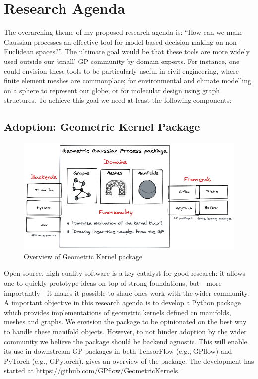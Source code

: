 \section{Research Agenda}
The overarching theme of my proposed research agenda is: ``How can we make Gaussian processes an effective tool for model-based decision-making on non-Euclidean spaces?''. The ultimate goal would be that these tools are more widely used outside our `small' GP community by domain experts. For instance, one could envision these tools to be particularly useful in civil engineering, where finite element meshes are commonplace; for environmental and climate modelling on a sphere to represent our globe; or for molecular design using graph structures. To achieve this goal we need at least the following components:

\subsection{Adoption: Geometric Kernel Package}

\begin{figure}
    \centering
    \includegraphics[width=.7\textwidth]{geomgp}
    \caption{Overview of Geometric Kernel package}
    \label{fig:geomgp}
\end{figure}

Open-source, high-quality software is a key catalyst for good research: it allows one to quickly prototype ideas on top of strong foundations, but---more importantly---it makes it possible to share ones work with the wider community. A important objective in this research agenda is to develop a Python package which provides implementations of geometric kernels defined on manifolds, meshes and graphs. We envision the package to be opinionated on the best way to handle these manifold objects. However, to not hinder adoption by the wider community we believe the package should be backend agnostic. This will enable its use in downstream GP packages in both TensorFlow (e.g., GPflow) and PyTorch (e.g., GPytorch).  gives an overview of the package. The development has started at \url{https://github.com/GPflow/GeometricKernels}.

